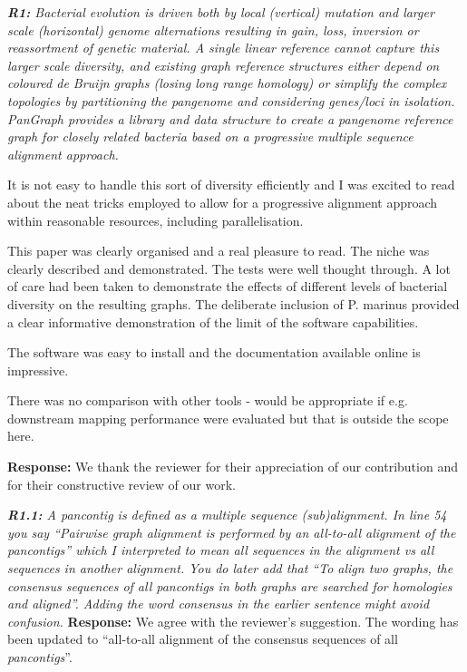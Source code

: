 \documentclass[aps,rmp,onecolumn]{revtex4-1}
\newcommand{\reviewer}[2]{{\it \textbf{#1:} #2\vskip 5mm}}
\newcommand{\response}[1]{{{\color{response}\textbf{Response:} #1}}\vskip 5mm}
\begin{document}
\reviewer{R1}{Bacterial evolution is driven both by local (vertical) mutation and larger scale (horizontal) genome alternations resulting in gain, loss, inversion or reassortment of genetic material. A single linear reference cannot capture this larger scale diversity, and existing graph reference structures either depend on coloured de Bruijn graphs (losing long range homology) or simplify the complex topologies by partitioning the pangenome and considering genes/loci in isolation. PanGraph provides a library and data structure to create a pangenome reference graph for closely related bacteria based on a progressive multiple sequence alignment approach.

      It is not easy to handle this sort of diversity efficiently and I was excited to read about the neat tricks employed to allow for a progressive alignment approach within reasonable resources, including parallelisation.

      This paper was clearly organised and a real pleasure to read. The niche was clearly described and demonstrated. The tests were well thought through. A lot of care had been taken to demonstrate the effects of different levels of bacterial diversity on the resulting graphs. The deliberate inclusion of P. marinus provided a clear informative demonstration of the limit of the software capabilities.

      The software was easy to install and the documentation available online is impressive.

      There was no comparison with other tools - would be appropriate if e.g. downstream mapping performance were evaluated but that is outside the scope here.}

\response{We thank the reviewer for their appreciation of our contribution and for their constructive review of our work.}

\reviewer{R1.1}{A pancontig is defined as a multiple sequence (sub)alignment. In line 54 you say ``Pairwise graph alignment is performed by an all-to-all alignment of the pancontigs'' which I interpreted to mean all sequences in the alignment vs all sequences in another alignment. You do later add that ``To align two graphs, the consensus sequences of all pancontigs in both graphs are searched for homologies and aligned''. Adding the word consensus in the earlier sentence might avoid confusion.}
\response{We agree with the reviewer's suggestion. The wording has been updated to ``all-to-all alignment of the consensus sequences of all \textit{pancontigs}''.}
\end{document}
